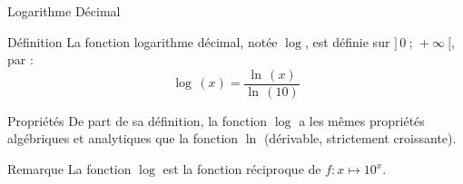\documentclass{cours}
\begin{document}
    \vspace{-2ex}
    \begin{Gpartie}{Logarithme Décimal} 
        \vspace{-2ex}
        \begin{Spartie}{Définition} 
            La fonction logarithme décimal, notée $\log$, est définie sur $\big]\,0~;\,+\infty~\big[$, par :
            \[\log\,(x)=\frac{\ln\,(x)}{\ln\,(10)}\]
        \end{Spartie}
        \vspace{-4ex}
        \begin{Spartie}{Propriétés} 
            De part de sa définition, la fonction $\log$ a les mêmes propriétés algébriques et analytiques que la fonction $\ln$ (dérivable, strictement croissante).
        \end{Spartie}
        \begin{Spartie}{Remarque} 
            La fonction $\log$ est la fonction réciproque de $f:x\mapsto 10^x$.
        \end{Spartie}
    \end{Gpartie}
\end{document}
